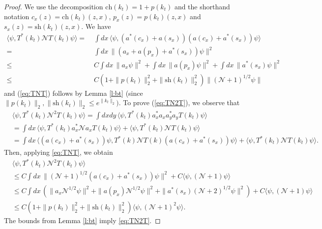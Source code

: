 \documentclass[11pt,a4paper]{article}
\newcommand{\N}{\mathcal{N}}
\begin{document}
\begin{proof}
We use the decomposition $\text{ch} (k_t) = 1 + p(k_t)$ and the shorthand notation $c_x(z) = \text{ch} (k_t) (z,x)$, $p_x(z) = p(k_t) (z,x)$ and $s_x(z) = \text{sh} (k_t) (z,x)$. We have
 \[\begin{split} 
  \langle \psi, T^* (k_t)  \N T (k_t) \psi \rangle = \; & \int dx \, \langle  \psi, (a^* (c_x) + a (s_x)) (a (c_x) + a^* (s_x)) \psi \rangle \\ = \; &\int dx \, \| (a_x + a(p_x) + a^*(s_x)) \psi
  \|^2 \\  \leq \; &C  \int dx \, \| a_x \psi \|^2
    + \int dx \, \| a(p_x) \psi \|^2 + \int dx \, \| a^*(s_x) \psi \|^2 \\
    \leq \; &C ( 1 + \| p (k_t) \|_2^2 + \| \text{sh} (k_t) \|_2^2 ) \| (\N + 1)^{1/2}  \psi \| 
      \end{split}\]
and (\ref{eq:TNT}) follows by Lemma \ref{l:bt} (since $\| p (k_t) \|_2, \| \text{sh} (k_t) \|_2 \leq e^{\| k_t \|_2})$. To prove (\ref{eq:TN2T}), we observe that 
\begin{align*}
 & \langle \psi, T^* (k_t) \N^2 T (k_t) \psi \rangle = \int dxdy \, \langle \psi, T^* (k_t)  a_x^* a_x a_y^* a_y T (k_t) \psi \rangle \\
    & = \int dx \, \langle \psi, T^* (k_t)  a_x^* \N a_x T (k_t) \psi \rangle + \langle
    \psi, T^* (k_t)  \N T (k_t) \psi \rangle \\
    & = \int dx \, \langle (a(c_x) + a^*(s_x)) \psi, T^* (k)  \N T (k) (a (c_x)  + a^*(s_x)) \psi \rangle + \langle \psi, T^* (k_t) \N T (k_t) \psi \rangle.
  \end{align*}
  Then, applying \eqref{eq:TNT},  we obtain
  \begin{align*}
    & \langle \psi, T^* (k_t) \N^2 T (k_t) \psi \rangle \\
    & \leq C \int dx \, \| (\N+1)^{1/2} (a (c_x) +
    a^*(s_x)) \psi \|^2 + C \langle \psi, (\N+1) \psi \rangle \\
    & \leq C \int dx \, (\| a_x \N^{1/2} \psi \|^2 + \| a(p_x)
    \N^{1/2} \psi \|^2 + \| a^*(s_x) (\N+2)^{1/2} \psi \|^2 ) + C \langle
    \psi, (\N+1) \psi \rangle \\
    & \leq C(1 + \| p (k_t) \|_{2}^2 + \| \text{sh} (k_t)  \|_{2}^2) \langle \psi, (\N+1)^2
    \psi \rangle.
  \end{align*}
The bounds from Lemma \ref{l:bt} imply \eqref{eq:TN2T}.
\end{proof}
\end{document}
